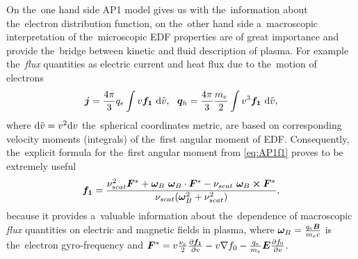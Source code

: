 On the~one hand side AP1 model gives us with the~information about 
the~electron distribution function, on the~other hand side 
a~macroscopic interpretation of the~microscopic EDF properties are of great
importance and provide the~bridge between kinetic and fluid description of 
plasma. For example the~\textit{flux} quantities as 
electric current and heat flux due to the~motion of electrons
\begin{equation}
  \boldsymbol{j} = \frac{4\pi}{3}q_e \int v \boldsymbol{f_1}~\text{d}\tilde{v},~~ 
  \boldsymbol{q}_h = \frac{4\pi}{3}\frac{m_e}{2} \int v^3 \boldsymbol{f_1}~\text{d}\tilde{v},
  \nonumber
\end{equation}
where $\text{d}\tilde{v} = v^2\text{d}v$ 
the~spherical coordinates metric,
are based on corresponding velocity moments (integrals) of the~first angular 
moment of EDF. Consequently, the~explicit formula for the~first angular moment
from \eqref{eq:AP1f1} proves to be extremely useful
\begin{equation}
  \boldsymbol{f_1} = \frac{\nu_{scat}^2 \boldsymbol{F}^* + \boldsymbol{\omega}_{B}~\boldsymbol{\omega}_{B}\cdot\boldsymbol{F}^* 
  - \nu_{scat}~\boldsymbol{\omega}_{B} \boldsymbol{\times} \boldsymbol{F}^*}{\nu_{scat} (\boldsymbol{\omega}_{B}^2 + \nu_{scat}^2)}
  ,
  \label{eq:f1_explicit}
\end{equation} 
because it provides a~valuable 
information about the~dependence of macroscopic \textit{flux} quantities on
electric and magnetic fields in plasma, 
where $\boldsymbol{\omega}_{B} = \frac{q_e\boldsymbol{B}}{m_e c}$ is the~electron gyro-frequency and 
$\boldsymbol{F}^* = v\frac{\nu_{e}}{2}\frac{\partial{\boldsymbol{f_1}}}{\partial{v}} - v\nabla f_0 
 - \frac{q_e}{m_e}\boldsymbol{E}\frac{\partial{f_0}}{\partial{v}}$.

